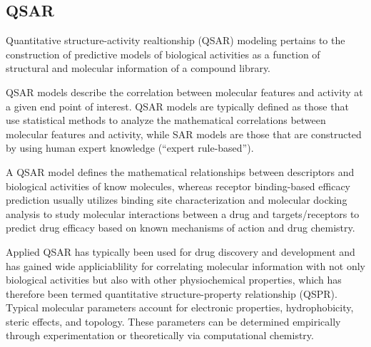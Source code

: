 \subsection{QSAR}

Quantitative structure-activity realtionship (QSAR) modeling pertains to the construction of predictive models of biological activities as a function of structural and molecular information of a compound library.\cite{Nantasenamat2009}

QSAR models describe the correlation between molecular features and activity at a given end point of interest. QSAR models are typically defined as those that use statistical methods to analyze the mathematical correlations between molecular features and activity, while SAR models are those that are constructed by using human expert knowledge (“expert rule-based”).

A QSAR model defines the mathematical relationships between descriptors and biological activities of know molecules, whereas receptor binding-based efficacy prediction usually utilizes binding site characterization and molecular docking analysis to study molecular interactions between a drug and targets/receptors to predict drug efficacy based on known mechanisms of action and drug chemistry. \cite{Kruhlak2012}

Applied QSAR has typically been used for drug discovery and development and has gained wide appliciablility for correlating molecular information with not only biological activities but also with other physiochemical properties, which has therefore been termed quantitative structure-property relationship (QSPR). Typical molecular parameters account for electronic properties, hydrophobicity, steric effects, and topology. These parameters can be determined empirically through experimentation or theoretically via computational chemistry. \cite{Nantasenamat2009}



